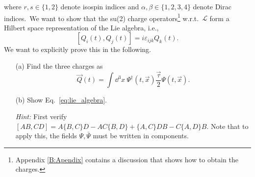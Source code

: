 \documentclass[11pt]{latex/exercise}
\begin{document}
where $r,s \in \{1,2\}$ denote isospin indices and $\alpha,\beta \in \{1,2,3,4\}$ denote Dirac indices.~We want to show that the su(2) charge operators\footnote*{Appendix \ref{B:Apendix} contains a discussion that shows how to obtain the charges.} w.r.t.\ $\mathcal{L}$ form a Hilbert space representation of the Lie algebra, i.e.,
\begin{equation}
    \label{eq:lie_algebra}
    [Q_i(t), Q_j(t)] = i \varepsilon_{ijk} Q_k(t) .
\end{equation}
We want to explicitly prove this in the following.

\begin{itemize}
    \item[(a)]
          Find the three charges as
          \begin{equation}
              \vec{Q}(t) = \int \dd^3 x \: \Psi^\dagger(t, \vec x) \frac{\vec\tau}{2} \Psi(t, \vec x) .
          \end{equation}

    \item[(b)]
          Show Eq.~\eqref{eq:lie_algebra}.

          \textit{Hint:} First verify $[AB,CD] = A \{B,C\} D - A C \{B,D\} + \{A,C\} D B - C \{A,D\} B$. Note that to apply this, the fields $\Psi, \bar\Psi$ must be written in components.
\end{itemize}
\end{document}
